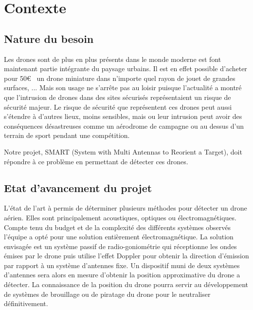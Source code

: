 
\chapter{Contexte}

\section{Nature du besoin}

Les drones sont de plus en plus présents dans le monde moderne est font maintenant partie intégrante du paysage urbains. Il est en effet possible d'acheter pour 50\euro~  un drone miniature dans n'importe quel rayon de jouet de grandes surfaces, ... %
Mais son usage ne s'arrête pas au loisir puisque l'actualité a montré que l'intrusion de drones dans des sites sécurisés représentaient un risque de sécurité majeur. Le risque de sécurité que représentent ces drones peut aussi s'étendre à d'autres lieux, moins sensibles, mais ou leur intrusion peut avoir des conséquences désastreuses comme un aérodrome de campagne ou au dessus d'un terrain de sport pendant une compétition.


Notre projet, SMART (System with Multi Antennas to Reorient a Target), doit répondre à ce problème en permettant de détecter ces drones.  

\section{Etat d'avancement du projet}


L'état de l'art à permis de déterminer plusieurs méthodes pour détecter un drone aérien. Elles sont principalement acoustiques, optiques ou électromagnétiques. Compte tenu du budget et de la complexité des différents systèmes observés l'équipe a opté pour une solution entièrement électromagnétique. La solution envisagée est un système passif de radio-goniométrie qui réceptionne les ondes émises par le drone puis utilise l'effet Doppler pour obtenir la direction d'émission par rapport à un système d'antennes fixe. Un dispositif muni de deux systèmes d'antennes sera alors en mesure d'obtenir la position approximative du drone a détecter. 
La connaissance de la position du drone pourra servir au développement de systèmes de brouillage ou de piratage du drone pour le neutraliser définitivement.

